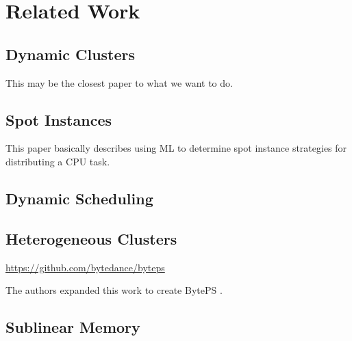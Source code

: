 \chapter{Related Work}
\label{ch:related work}

\section{Dynamic Clusters}


This may be the closest paper to what we want to do.

\section{Spot Instances}



This paper basically describes using ML to determine spot instance strategies
for distributing a CPU task.

\section{Dynamic Scheduling}




\section{Heterogeneous Clusters}



\url{https://github.com/bytedance/byteps}


The authors expanded this work to create BytePS \cite{osdi/2020/jiang}.

\section{Sublinear Memory}

